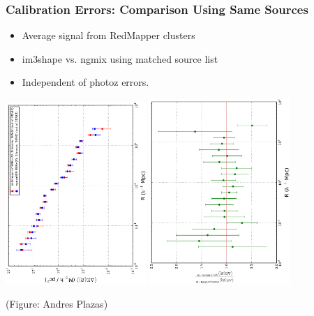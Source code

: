 \documentclass{beamer}
\begin{document}
\frame
{
    \frametitle{Calibration Errors: Comparison Using Same Sources}

    \begin{itemize}

        \item Average signal from RedMapper clusters
        \item im3shape vs. ngmix using matched source list
        \item Independent of photoz errors.
    \end{itemize}

    \begin{center}
        \includegraphics[width=0.4\textwidth,angle=-90]{dsig_compare_crop.pdf}
        \includegraphics[width=0.4\textwidth,angle=-90]{dsig_ratio_crop.pdf}
    \end{center}
    {\tiny (Figure: Andres Plazas)}
}
\end{document}

